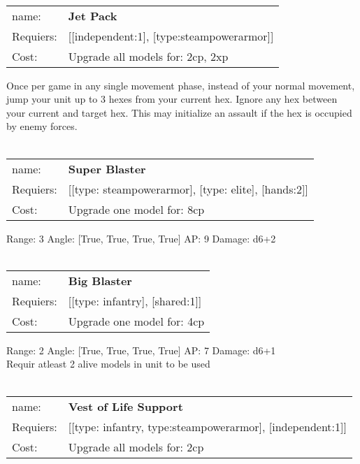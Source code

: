 \ \\
\begin{tabular}{ll}
name: & {\bf Jet Pack } \\
Requiers: & [[independent:1], [type:steampowerarmor]] \\
Cost: & Upgrade all models for: 2cp, 2xp \\
\end{tabular}

Once per game in any single movement phase, instead of your normal movement, jump your unit up to 3 hexes from your current hex. Ignore any hex between your current and target hex. This may initialize an assault if the hex is occupied by enemy forces.\\ 









\ \\
\begin{tabular}{ll}
name: & {\bf Super Blaster } \\
Requiers: & [[type: steampowerarmor], [type: elite], [hands:2]] \\
Cost: & Upgrade one model for: 8cp \\
\end{tabular}



Range: 3  Angle: [True, True, True, True] AP: 9 Damage: d6+2 \\








\ \\
\begin{tabular}{ll}
name: & {\bf Big Blaster } \\
Requiers: & [[type: infantry], [shared:1]] \\
Cost: & Upgrade one model for: 4cp \\
\end{tabular}



Range: 2  Angle: [True, True, True, True] AP: 7 Damage: d6+1 \\
Requir atleast 2 alive models in unit to be used\\ 








\ \\
\begin{tabular}{ll}
name: & {\bf Vest of Life Support } \\
Requiers: & [[type: infantry, type:steampowerarmor], [independent:1]] \\
Cost: & Upgrade all models for: 2cp \\
\end{tabular}

